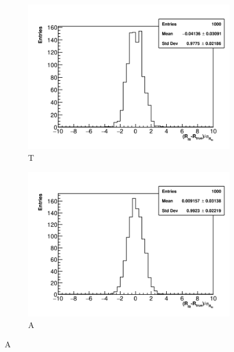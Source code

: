 \begin{figure}[]
\centering
    \begin{subfigure}[t]{0.45\textwidth}
        \centering
        \includegraphics[width=\textwidth]{Rpull_TMethod}
        \caption{T}
    \end{subfigure}
    \hspace{1mm}
    \begin{subfigure}[t]{0.45\textwidth}
        \centering
        \includegraphics[width=\textwidth]{Rpull_AMethod}
        \caption{A}
    \end{subfigure}%


\end{figure}
